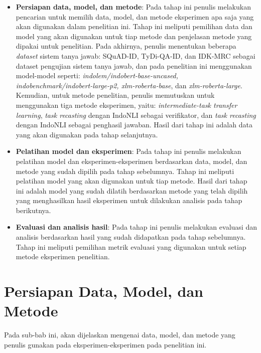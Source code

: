 \begin{itemize}
    
    \item \textbf{Persiapan data, model, dan metode}: Pada tahap ini penulis melakukan pencarian untuk memilih data, model, dan metode eksperimen apa saja yang akan digunakan dalam penelitian ini. Tahap ini meliputi pemilihan data dan model yang akan digunakan untuk tiap metode dan penjelasan metode yang dipakai untuk penelitian. Pada akhirnya, penulis menentukan beberapa \emph{dataset} sistem tanya jawab: SQuAD-ID, TyDi-QA-ID, dan IDK-MRC sebagai dataset pengujian sistem tanya jawab, dan pada penelitian ini menggunakan model-model seperti: \emph{indolem/indobert-base-uncased, indobenchmark/indobert-large-p2, xlm-roberta-base}, dan \emph{xlm-roberta-large}. Kemudian, untuk metode penelitian, penulis memutuskan untuk menggunakan tiga metode eksperimen, yaitu: \emph{intermediate-task transfer learning}, \emph{task recasting} dengan IndoNLI sebagai verifikator, dan \emph{task recasting} dengan IndoNLI sebagai penghasil jawaban. Hasil dari tahap ini adalah data yang akan digunakan pada tahap selanjutnya.

    \item \textbf{Pelatihan model dan eksperimen}: Pada tahap ini penulis melakukan pelatihan model dan eksperimen-eksperimen berdasarkan data, model, dan metode yang sudah dipilih pada tahap sebelumnya. Tahap ini meliputi pelatihan model yang akan digunakan untuk tiap metode. Hasil dari tahap ini adalah model yang sudah dilatih berdasarkan metode yang telah dipilih yang menghasilkan hasil eksperimen untuk dilakukan analisis pada tahap berikutnya.

    \item \textbf{Evaluasi dan analisis hasil}: Pada tahap ini penulis melakukan evaluasi dan analisis berdasarkan hasil yang sudah didapatkan pada tahap sebelumnya. Tahap ini meliputi pemilihan metrik evaluasi yang digunakan untuk setiap metode eksperimen penelitian.

\end{itemize}

\section{Persiapan Data, Model, dan Metode}
Pada sub-bab ini, akan dijelaskan mengenai data, model, dan metode yang penulis gunakan pada eksperimen-eksperimen pada penelitian ini. 

